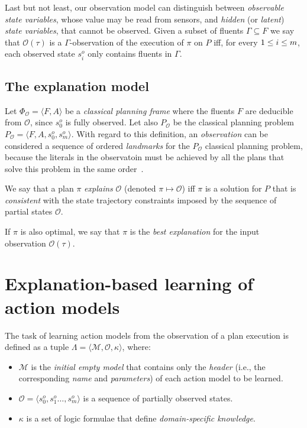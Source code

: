 \documentclass[runningheads]{llncs}
\newcommand{\tup}[1]{{\langle #1 \rangle}}
\begin{document}
Last but not least, our observation model can distinguish between {\em observable state variables}, whose value may be read from sensors, and {\em hidden} (or {\em latent}) {\em state variables}, that cannot be observed. Given a subset of fluents $\Gamma\subseteq F$ we say that $\mathcal{O}(\tau)$ is a $\Gamma$-observation of the execution of $\pi$ on $P$ iff, for every ${\small 1\leq i\leq m}$, each observed state $s_i^o$ only contains fluents in $\Gamma$.

\subsection{The explanation model}
Let $\Phi_\mathcal{O}=\tup{F,A}$ be a {\em classical planning frame} where the fluents $F$ are deducible from $\mathcal{O}$, since $s_0^o$ is fully observed. Let also $P_\mathcal{O}$ be the classical planning problem $P_\mathcal{O}=\tup{F,A,s_0^o,s_m^o}$. With regard to this definition, an {\em observation} can be considered a sequence of ordered {\em landmarks} for the $P_\mathcal{O}$ classical planning problem, because the literals in the observatoin must be achieved by all the plans that solve this problem in the same order~\cite{hoffmann2004ordered}.

\begin{definition}[Explanation]
We say that a plan $\pi$ {\em explains} $\mathcal{O}$ (denoted $\pi\mapsto\mathcal{O}$) iff $\pi$ is a solution for $P$ that is {\em consistent} with the state trajectory constraints imposed by the sequence of partial states $\mathcal{O}$.  
\end{definition}
If $\pi$ is also optimal, we say that $\pi$ is the {\em best explanation} for the input observation $\mathcal{O}(\tau)$.



\section{Explanation-based learning of action models}
The task of learning action models from the observation of a plan execution is defined as a tuple $\Lambda=\tup{\mathcal{M},{\mathcal O},\kappa}$, where:

\begin{itemize}
\item $\mathcal{M}$ is the {\em initial empty model} that contains only the {\em header} (i.e., the corresponding {\em name} and {\em parameters}) of each action model to be learned.
\item $\mathcal{O}=\tup{s_0^o,s_1^o \ldots , s_m^o}$ is a sequence of partially observed states.
\item $\kappa$ is a set of logic formulae that define {\em domain-specific knowledge}.
\end{itemize}
\end{document}
